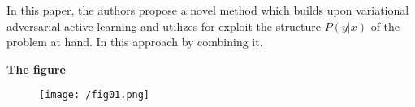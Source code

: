 \documentclass[12pt]{article}
\begin{document}
In this paper, the authors propose a novel method which builds upon
variational adversarial active learning \cite{VAAL} and utilizes
\cite{LearningLoss} for exploit the structure \(P(y|x)\) of the problem at hand.
In this approach by combining it.





\noindent
\textbf{The figure}
\begin{figure}[h]
  \centering
  \texttt{[image: /fig01.png]}
\end{figure}




\newpage



\end{document}
